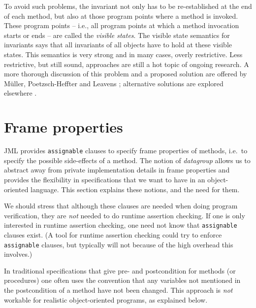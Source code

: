 \documentclass{llncs}
\begin{document}
To avoid such problems, the invariant not only has to be re-established at the
end of each method, but also at those program points where a method is invoked.
These program points -- i.e., all program points
at which a method invocation starts or ends -- are called the \emph{visible
states}. The visible state semantics for invariants says that all invariants
of all objects have to hold at these visible states.
%
This semantics is very strong and in many cases,
overly restrictive.  Less restrictive, but still sound, approaches are still a
hot topic of ongoing research. A more thorough discussion of this problem
and a proposed solution are offered by M\"{u}ller, Poetzsch-Heffter and
Leavens \cite{Mueller-Poetzsch-Heffter-Leavens05}; alternative solutions are
explored elsewhere
\cite{Huizing-Kuiper00,JacobsLeinoPiessensSchulte05,Middelkoop05}.

\section{Frame properties}
\label{Sec:assignable}


JML provides \texttt{assignable} clauses to specify frame properties
of methods, i.e.\ to specify the possible side-effects of a method.
The notion of \emph{datagroup} allows us to abstract away from private implementation 
details in frame properties and provides the flexibility in specifications
that we want to have in an object-oriented language.
This section explains these notions, and the need for them.

We should stress that although these clauses are needed when doing
program verification, they are \emph{not} needed to do runtime assertion checking. 
If one is only interested in runtime assertion checking, one need not know 
that \texttt{assignable} clauses exist.
(A tool for runtime assertion checking could try to enforce \texttt{assignable} 
clauses, but typically will not because of the high overhead this involves.)

\smallskip

In traditional specifications that give pre- and postcondition for methods
(or procedures) one often uses the convention that any variables not mentioned 
in the postcondition of a method have not been changed.  This approach is 
\emph{not} workable for realistic object-oriented programs, as explained below.
\end{document}
